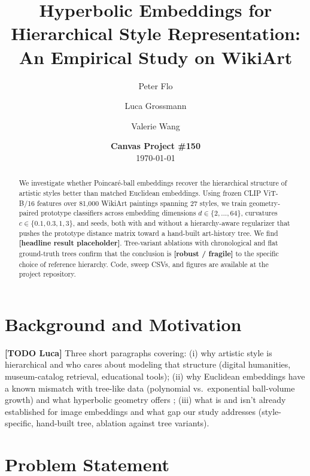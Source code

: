 \documentclass[11pt]{article}
\title{Hyperbolic Embeddings for Hierarchical Style Representation: \\
  An Empirical Study on WikiArt}
\author[1]{Peter Flo}
\author[1]{Luca Grossmann}
\author[1]{Valerie Wang}
\affil[1]{Harvard University, COMPSCI 2090B (Spring 2026)}
\date{\textbf{Canvas Project \#150} \\ \today}
\newcommand{\TODO}[2]{\textcolor{red!70!black}{\textbf{[TODO #1]} #2}}
\begin{document}
\maketitle

\begin{abstract}
We investigate whether Poincar\'e-ball embeddings recover the hierarchical
structure of artistic styles better than matched Euclidean embeddings. Using
frozen CLIP ViT-B/16 features over 81{,}000 WikiArt paintings spanning 27
styles, we train geometry-paired prototype classifiers across embedding
dimensions $d \in \{2,\dots,64\}$, curvatures $c \in \{0.1, 0.3, 1, 3\}$, and
seeds, both with and without a hierarchy-aware regularizer that pushes the
prototype distance matrix toward a hand-built art-history tree. We find
\textbf{[headline result placeholder]}. Tree-variant ablations with
chronological and flat ground-truth trees confirm that the conclusion is
\textbf{[robust / fragile]} to the specific choice of reference hierarchy.
Code, sweep CSVs, and figures are available at the project repository.
\end{abstract}

\section{Background and Motivation} %
\TODO{Luca}{Three short paragraphs covering: (i) why artistic style is
hierarchical and who cares about modeling that structure (digital humanities,
museum-catalog retrieval, educational tools); (ii) why Euclidean embeddings
have a known mismatch with tree-like data (polynomial vs.\ exponential
ball-volume growth) and what hyperbolic geometry offers
\citep{nickel2017poincare,ganea2018hyperbolic}; (iii) what is and isn't
already established for image embeddings \citep{khrulkov2020hyperbolic} and
what gap our study addresses (style-specific, hand-built tree, ablation
against tree variants).}

\section{Problem Statement} %
\end{document}
